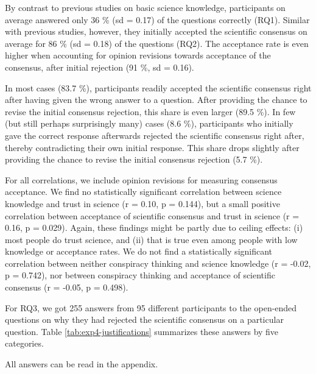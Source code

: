 \documentclass[
  doc,floatsintext]{apa6}
\begin{document}
By contrast to previous studies on basic science knowledge, participants on average answered only 36 \% (sd = 0.17) of the questions correctly (RQ1). Similar with previous studies, however, they initially accepted the scientific consensus on average for 86 \% (sd = 0.18) of the questions (RQ2). The acceptance rate is even higher when accounting for opinion revisions towards acceptance of the consensus, after initial rejection (91 \%, sd = 0.16).

In most cases (83.7 \%), participants readily accepted the scientific consensus right after having given the wrong answer to a question. After providing the chance to revise the initial consensus rejection, this share is even larger (89.5 \%). In few (but still perhaps surprisingly many) cases (8.6 \%), participants who initially gave the correct response afterwards rejected the scientific consensus right after, thereby contradicting their own initial response. This share drops slightly after providing the chance to revise the initial consensus rejection (5.7 \%).

For all correlations, we include opinion revisions for measuring consensus acceptance. We find no statistically significant correlation between science knowledge and trust in science (r = 0.10, p = 0.144), but a small positive correlation between acceptance of scientific consensus and trust in science (r = 0.16, p = 0.029). Again, these findings might be partly due to ceiling effects: (i) most people do trust science, and (ii) that is true even among people with low knowledge or acceptance rates. We do not find a statistically significant correlation between neither conspiracy thinking and science knowledge (r = -0.02, p = 0.742), nor between conspiracy thinking and acceptance of scientific consensus (r = -0.05, p = 0.498).

For RQ3, we got 255 answers from 95 different participants to the open-ended questions on why they had rejected the scientific consensus on a particular question. Table \ref{tab:exp4-justifications} summarizes these answers by five categories.

All answers can be read in the appendix.
\end{document}
